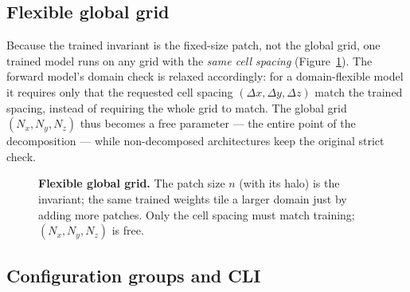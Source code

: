 \documentclass[11pt]{article}
\begin{document}
\subsection{Flexible global grid}\label{sec:flexible}

Because the trained invariant is the fixed-size patch, not the global grid, one
trained model runs on any grid with the \emph{same cell spacing}
(Figure~\ref{fig:flexible}). The forward model's domain check is relaxed
accordingly: for a domain-flexible model it requires only that the requested cell
spacing $(\Delta x,\Delta y,\Delta z)$ match the trained spacing, instead of
requiring the whole grid to match. The global grid $(N_x,N_y,N_z)$ thus becomes a
free parameter --- the entire point of the decomposition --- while non-decomposed
architectures keep the original strict check.

\begin{figure}[t]
\centering
{}
\caption{\textbf{Flexible global grid.} The patch size $n$ (with its halo) is the
invariant; the same trained weights tile a larger domain just by adding more
patches. Only the cell spacing must match training; $(N_x,N_y,N_z)$ is free.}
\label{fig:flexible}
\end{figure}

\subsection{Configuration groups and CLI}\label{sec:config}
\end{document}
